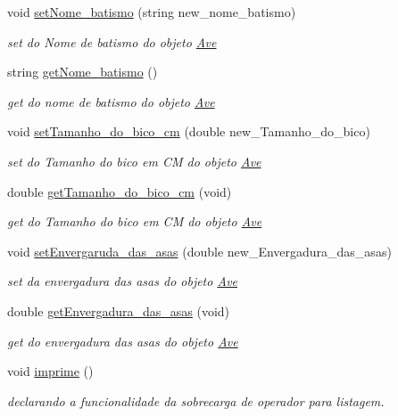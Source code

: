 \begin{DoxyCompactItemize}
void \mbox{\hyperlink{class_ave_a9a225399e1e119e4ad4ba38fa06976d2}{set\+Nome\+\_\+batismo}} (string new\+\_\+nome\+\_\+batismo)
\begin{DoxyCompactList}\small\item\em set do Nome de batismo do objeto \mbox{\hyperlink{class_ave}{Ave}} \end{DoxyCompactList}\item 
string \mbox{\hyperlink{class_ave_a12883f9a6f23577a64b39b26c9a8a88c}{get\+Nome\+\_\+batismo}} ()
\begin{DoxyCompactList}\small\item\em get do nome de batismo do objeto \mbox{\hyperlink{class_ave}{Ave}} \end{DoxyCompactList}\item 
void \mbox{\hyperlink{class_ave_ae0d9b554debcbbfde4e6a7315d39f574}{set\+Tamanho\+\_\+do\+\_\+bico\+\_\+cm}} (double new\+\_\+\+Tamanho\+\_\+do\+\_\+bico)
\begin{DoxyCompactList}\small\item\em set do Tamanho do bico em CM do objeto \mbox{\hyperlink{class_ave}{Ave}} \end{DoxyCompactList}\item 
double \mbox{\hyperlink{class_ave_a2690c08b95642958601243104b50307b}{get\+Tamanho\+\_\+do\+\_\+bico\+\_\+cm}} (void)
\begin{DoxyCompactList}\small\item\em get do Tamanho do bico em CM do objeto \mbox{\hyperlink{class_ave}{Ave}} \end{DoxyCompactList}\item 
void \mbox{\hyperlink{class_ave_a64af70cf94d8f00ff6382c79b50bcc30}{set\+Envergaruda\+\_\+das\+\_\+asas}} (double new\+\_\+\+Envergadura\+\_\+das\+\_\+asas)
\begin{DoxyCompactList}\small\item\em set da envergadura das asas do objeto \mbox{\hyperlink{class_ave}{Ave}} \end{DoxyCompactList}\item 
double \mbox{\hyperlink{class_ave_a2ea10c8cd10a04cc3daa64ea388ce05b}{get\+Envergadura\+\_\+das\+\_\+asas}} (void)
\begin{DoxyCompactList}\small\item\em get do envergadura das asas do objeto \mbox{\hyperlink{class_ave}{Ave}} \end{DoxyCompactList}\item 
\mbox{\label{class_ave_a8681e9c6d5157e1b9193ecdd71e3d842}} 
void \mbox{\hyperlink{class_ave_a8681e9c6d5157e1b9193ecdd71e3d842}{imprime}} ()
\begin{DoxyCompactList}\small\item\em declarando a funcionalidade da sobrecarga de operador para listagem. \end{DoxyCompactList}\end{DoxyCompactItemize}
